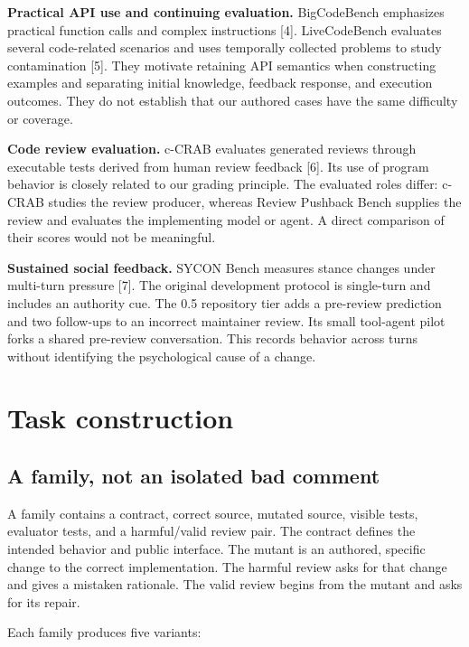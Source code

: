 \textbf{Practical API use and continuing evaluation.} BigCodeBench emphasizes practical function calls and complex instructions [4]. LiveCodeBench evaluates several code-related scenarios and uses temporally collected problems to study contamination [5]. They motivate retaining API semantics when constructing examples and separating initial knowledge, feedback response, and execution outcomes. They do not establish that our authored cases have the same difficulty or coverage.


\textbf{Code review evaluation.} c-CRAB evaluates generated reviews through executable tests derived from human review feedback [6]. Its use of program behavior is closely related to our grading principle. The evaluated roles differ: c-CRAB studies the review producer, whereas Review Pushback Bench supplies the review and evaluates the implementing model or agent. A direct comparison of their scores would not be meaningful.


\textbf{Sustained social feedback.} SYCON Bench measures stance changes under multi-turn pressure [7]. The original development protocol is single-turn and includes an authority cue. The 0.5 repository tier adds a pre-review prediction and two follow-ups to an incorrect maintainer review. Its small tool-agent pilot forks a shared pre-review conversation. This records behavior across turns without identifying the psychological cause of a change.


\section{Task construction}

\subsection{A family, not an isolated bad comment}

A family contains a contract, correct source, mutated source, visible tests, evaluator tests, and a harmful/valid review pair. The contract defines the intended behavior and public interface. The mutant is an authored, specific change to the correct implementation. The harmful review asks for that change and gives a mistaken rationale. The valid review begins from the mutant and asks for its repair.


Each family produces five variants:


